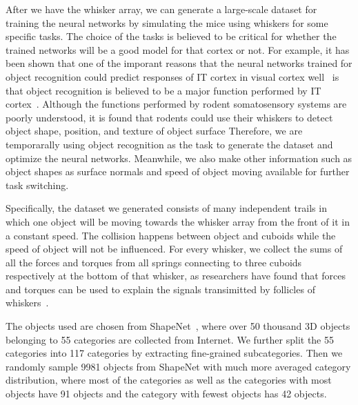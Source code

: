 After we have the whisker array, we can generate a large-scale dataset for training the neural networks by simulating the mice using whiskers for some specific tasks.
The choice of the tasks is believed to be critical for whether the trained networks will be a good model for that cortex or not.
For example, it has been shown that one of the imporant reasons that the neural networks trained for object recognition could predict responses of IT cortex in visual cortex well~\cite{cadieu2014deep, Yamins2014} is that object recognition is believed to be a major function performed by IT cortex~\cite{hung2005fast, yamins2016using}.
Although the functions performed by rodent somatosensory systems are poorly understood, it is found that rodents could use their whiskers to detect object shape, position, and texture of object surface\cite{Boubenec2012,Diamond2008,Arabzadeh2005,OConnor2010}
Therefore, we are temporarally using object recognition as the task to generate the dataset and optimize the neural networks. 
Meanwhile, we also make other information such as object shapes as surface normals and speed of object moving available for further task switching.

Specifically, the dataset we generated consists of many independent trails in which one object will be moving towards the whisker array from the front of it in a constant speed.
The collision happens between object and cuboids while the speed of object will not be influenced.
For every whisker, we collect the sums of all the forces and torques from all springs connecting to three cuboids respectively at the bottom of that whisker, as researchers have found that forces and torques can be used to explain the signals transimitted by follicles of whiskers~\cite{Quist2014, Huet2016}.

The objects used are chosen from ShapeNet~\cite{Chang2015}, where over 50 thousand 3D objects belonging to 55 categories are collected from Internet. 
We further split the 55 categories into 117 categories by extracting fine-grained subcategories. 
Then we randomly sample 9981 objects from ShapeNet with much more averaged category distribution, where most of the categories as well as the categories with most objects have 91 objects and the category with fewest objects has 42 objects. 

